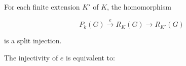 For each finite extension $K'$ of $K$, the homomorphism

$$P_k(G) \xrightarrow{e} R_K(G) \rightarrow R_{K'}(G)$$

is a split injection.

The injectivity of $e$ is equivalent to:
